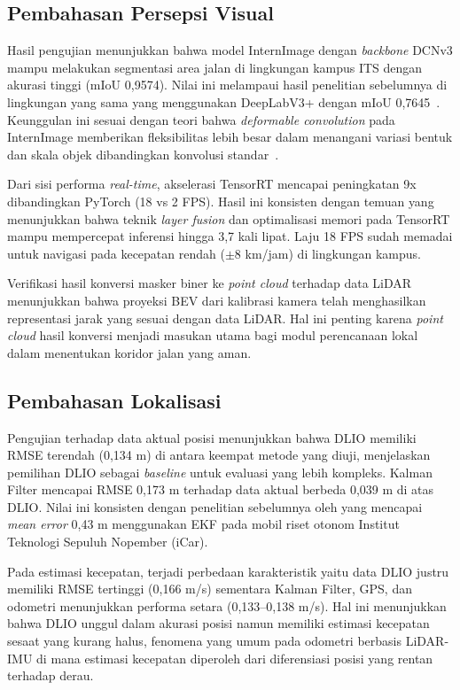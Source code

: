 \subsection{Pembahasan Persepsi Visual}
\label{sec:bahas_persepsi}

Hasil pengujian menunjukkan bahwa model InternImage dengan \emph{backbone} DCNv3 mampu melakukan segmentasi area jalan di lingkungan kampus ITS dengan akurasi tinggi (mIoU 0,9574).
Nilai ini melampaui hasil penelitian sebelumnya di lingkungan yang sama yang menggunakan DeepLabV3+ dengan mIoU 0,7645~\parencite{Dharma2025PerformanceEvaluation}.
Keunggulan ini sesuai dengan teori bahwa \emph{deformable convolution} pada InternImage memberikan fleksibilitas lebih besar dalam menangani variasi bentuk dan skala objek dibandingkan konvolusi standar~\parencite{wang2023internimage}.

Dari sisi performa \emph{real-time}, akselerasi TensorRT mencapai peningkatan 9x dibandingkan PyTorch (18 vs 2 FPS).
Hasil ini konsisten dengan temuan \textcite{zhou2022exploring} yang menunjukkan bahwa teknik \emph{layer fusion} dan optimalisasi memori pada TensorRT mampu mempercepat inferensi hingga 3,7 kali lipat.
Laju 18 FPS sudah memadai untuk navigasi pada kecepatan rendah ($\pm$8 km/jam) di lingkungan kampus.

Verifikasi hasil konversi masker biner ke \emph{point cloud} terhadap data LiDAR menunjukkan bahwa proyeksi BEV dari kalibrasi kamera telah menghasilkan representasi jarak yang sesuai dengan data LiDAR.
Hal ini penting karena \emph{point cloud} hasil konversi menjadi masukan utama bagi modul perencanaan lokal dalam menentukan koridor jalan yang aman.

\subsection{Pembahasan Lokalisasi}
\label{sec:bahas_lokalisasi}

Pengujian terhadap data aktual posisi menunjukkan bahwa DLIO memiliki RMSE terendah (0,134 m) di antara keempat metode yang diuji, menjelaskan pemilihan DLIO sebagai \emph{baseline} untuk evaluasi yang lebih kompleks.
Kalman Filter mencapai RMSE 0,173 m terhadap data aktual berbeda 0,039 m di atas DLIO.
Nilai ini konsisten dengan penelitian sebelumnya oleh \textcite{Zazuli2024SensorFusion} yang mencapai \emph{mean error} 0,43 m menggunakan EKF pada mobil riset otonom Institut Teknologi Sepuluh Nopember (iCar). 

Pada estimasi kecepatan, terjadi perbedaan karakteristik yaitu data DLIO justru memiliki RMSE tertinggi (0,166 m/s) sementara Kalman Filter, GPS, dan odometri menunjukkan performa setara (0,133--0,138 m/s).
Hal ini menunjukkan bahwa DLIO unggul dalam akurasi posisi namun memiliki estimasi kecepatan sesaat yang kurang halus, fenomena yang umum pada odometri berbasis LiDAR-IMU di mana estimasi kecepatan diperoleh dari diferensiasi posisi yang rentan terhadap derau.

